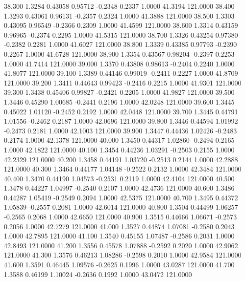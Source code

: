   38.300   1.3284   0.43058   0.95712  -0.2348   0.2337   1.0000  41.3194 121.0000
  38.400   1.3293   0.43061   0.96131  -0.2357   0.2324   1.0000  41.3888 121.0000
  38.500   1.3303   0.43095   0.96549  -0.2366   0.2309   1.0000  41.4599 121.0000
  38.600   1.3314   0.43159   0.96965  -0.2374   0.2295   1.0000  41.5315 121.0000
  38.700   1.3326   0.43254   0.97380  -0.2382   0.2281   1.0000  41.6027 121.0000
  38.800   1.3339   0.43385   0.97793  -0.2390   0.2267   1.0000  41.6728 121.0000
  38.900   1.3354   0.43567   0.98204  -0.2397   0.2253   1.0000  41.7414 121.0000
  39.000   1.3370   0.43808   0.98613  -0.2404   0.2240   1.0000  41.8077 121.0000
  39.100   1.3389   0.44146   0.99019  -0.2411   0.2227   1.0000  41.8709 121.0000
  39.200   1.3411   0.44643   0.99423  -0.2416   0.2215   1.0000  41.9301 121.0000
  39.300   1.3438   0.45406   0.99827  -0.2421   0.2205   1.0000  41.9827 121.0000
  39.500   1.3446   0.45290   1.00685  -0.2441   0.2196   1.0000  42.0248 121.0000
  39.600   1.3445   0.45022   1.01120  -0.2452   0.2192   1.0000  42.0448 121.0000
  39.700   1.3445   0.44791   1.01556  -0.2462   0.2187   1.0000  42.0696 121.0000
  39.800   1.3446   0.44594   1.01992  -0.2473   0.2181   1.0000  42.1003 121.0000
  39.900   1.3447   0.44436   1.02426  -0.2483   0.2174   1.0000  42.1378 121.0000
  40.000   1.3450   0.44317   1.02860  -0.2494   0.2165   1.0000  42.1822 121.0000
  40.100   1.3454   0.44236   1.03291  -0.2503   0.2155   1.0000  42.2329 121.0000
  40.200   1.3458   0.44191   1.03720  -0.2513   0.2144   1.0000  42.2888 121.0000
  40.300   1.3464   0.44177   1.04148  -0.2522   0.2132   1.0000  42.3484 121.0000
  40.400   1.3470   0.44190   1.04573  -0.2531   0.2119   1.0000  42.4104 121.0000
  40.500   1.3478   0.44227   1.04997  -0.2540   0.2107   1.0000  42.4736 121.0000
  40.600   1.3486   0.44287   1.05419  -0.2549   0.2094   1.0000  42.5375 121.0000
  40.700   1.3495   0.44372   1.05839  -0.2557   0.2081   1.0000  42.6014 121.0000
  40.800   1.3504   0.44499   1.06257  -0.2565   0.2068   1.0000  42.6650 121.0000
  40.900   1.3515   0.44666   1.06671  -0.2573   0.2056   1.0000  42.7279 121.0000
  41.000   1.3527   0.44874   1.07081  -0.2580   0.2043   1.0000  42.7895 121.0000
  41.100   1.3540   0.45155   1.07487  -0.2586   0.2031   1.0000  42.8493 121.0000
  41.200   1.3556   0.45578   1.07888  -0.2592   0.2020   1.0000  42.9062 121.0000
  41.300   1.3576   0.46213   1.08286  -0.2598   0.2010   1.0000  42.9584 121.0000
  41.600   1.3591   0.46445   1.09576  -0.2625   0.1996   1.0000  43.0287 121.0000
  41.700   1.3588   0.46199   1.10024  -0.2636   0.1992   1.0000  43.0472 121.0000
